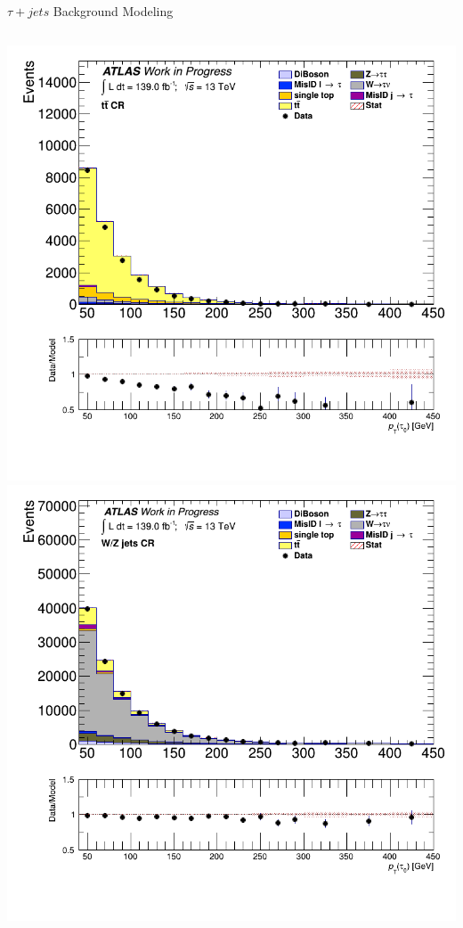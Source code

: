 \documentclass[aspectratio=169,xcolor=table]{beamer}
\begin{document}
      \begin{frame}[t]{$\tau+jets$ Background Modeling}
          \begin{columns}[t]

          \includegraphics[height=.45\textheight,keepaspectratio=true]{taujet_1p_3p/v09/tau_0_pt_TTBAR.png}
          \includegraphics[height=.45\textheight,keepaspectratio=true]{taujet_1p_3p/v09/tau_0_pt_WJETS.png}


\end{columns}
\end{frame}
\end{document}
